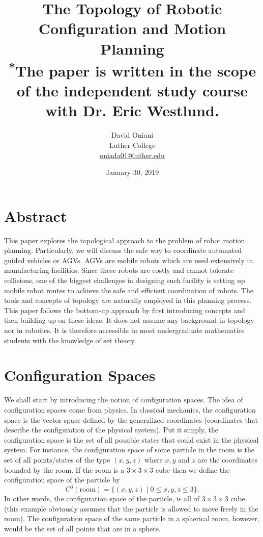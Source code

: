 \documentclass[a4paper, twocolumn]{article}
\title{The Topology of Robotic Configuration and Motion Planning\\
{\small \textsuperscript{*}The paper is written in the scope of the independent study course with Dr. Eric Westlund.}}
\author{David Oniani\\Luther College\\\href{mailto:oniada01@luther.edu}{oniada01@luther.edu}}
\date{January 30, 2019}
\theoremstyle{definition}
\begin{document}
\maketitle


\section*{\centering Abstract}
This paper explores the topological approach to the problem
of robot motion planning. Particularly, we will discuss
the safe way to coordinate automated guided vehicles or AGVs.
AGVs are mobile robots which are used extensively in manufacturing
facilities. Since these robots are costly and cannot tolerate collisions,
one of the biggest challenges in designing such facility is setting up
mobile robot routes to achieve the safe and efficient coordination of robots.
The tools and concepts of topology are naturally employed in this planning
process. This paper follows the bottom-up approach by first introducing
concepts and then building up on these ideas. It does not assume any background
in topology nor in robotics. It is therefore accessible to most undergraduate
mathematics students with the knowledge of set theory.


\section*{\centering Configuration Spaces}
We shall start by introducing the notion of configuration spaces.
The idea of configuration spaces come from physics. In classical mechanics,
the configuration space is the vector space defined by the generalized
coordinates (coordinates that describe the configuration of the physical system).
Put it simply, the configuration space is the set of all possible states that
could exist in the physical system. For instance, the configuration space of some
particle in the room is the set of all points/states of the type $(x, y, z)$ where
$x, y$ and $z$ are the coordinates bounded by the room. If the room is a $3 \times 3 \times 3$
cube then we define the configuration space of the particle by
$$C^3(\text{room}) = \{(x, y, z) \mid 0 \leq x, y, z \leq 3\}.$$
In other words, the configuration space of the particle, is all of $3 \times 3 \times 3$ cube
(this example obviously assumes that the particle is allowed to move freely in the room).
The configuration space of the same particle in a spherical room, however, would be the set of all
points that are in a sphere.
\end{document}
